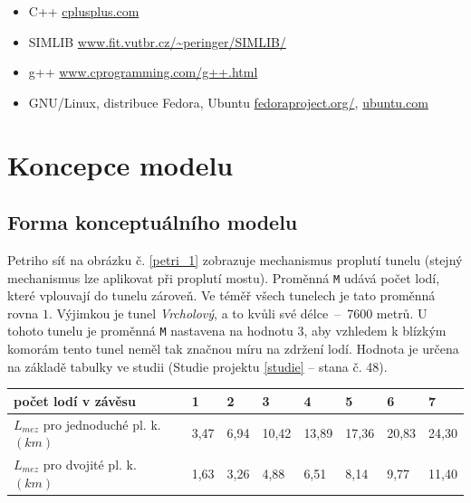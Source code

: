 \documentclass[11pt,a4paper]{article}
\begin{document}
      \begin{itemize}
        \item C++ \href{http://www.cplusplus.com/}{cplusplus.com}
        \item SIMLIB
          \href{http://www.fit.vutbr.cz/~peringer/SIMLIB/}
               {www.fit.vutbr.cz/\textasciitilde peringer/SIMLIB/}
        \item g++ \href{http://www.cprogramming.com/g++.html}
                       {www.cprogramming.com/g++.html}
        \item GNU/Linux, distribuce Fedora, Ubuntu
          \href{http://fedoraproject.org}{fedoraproject.org/},
          \href{http://ubuntu.com}{ubuntu.com}
      \end{itemize}

  \section{Koncepce modelu}

    \subsection{Forma konceptuálního modelu}


      Petriho síť na obrázku č. \ref{petri_1} zobrazuje mechanismus proplutí
      tunelu (stejný mechanismus lze aplikovat při proplutí mostu).
      Proměnná \texttt{M} udává počet lodí, které vplouvají do tunelu zároveň.
      Ve téměř všech tunelech je tato proměnná rovna $1$. Výjimkou je tunel
      \textit{Vrcholový}, a to kvůli své délce \,--\, 7600 metrů. U tohoto
      tunelu je proměnná \texttt{M} nastavena na hodnotu $3$, aby vzhledem k
      blízkým komorám tento tunel neměl tak značnou míru na zdržení lodí.
      Hodnota je určena na základě tabulky ve
      studii (Studie projektu \ref{studie} -- stana č. 48).

      \begin{center}
        \begin{tabular}{| l | l | l | l | l | l | l | l |}
          \hline
          počet lodí v závěsu & 1 & 2 & 3 & 4 & 5 & 6 & 7 \\ \hline
          $L_{mez}$ pro jednoduché pl. k. $(km)$
            & 3,47 & 6,94 & 10,42 & 13,89 & 17,36 & 20,83 & 24,30 \\ \hline
          $L_{mez}$ pro dvojité pl. k. $(km)$
            & 1,63 & 3,26 &  4,88 &  6,51 &  8,14 &  9,77 & 11,40 \\ \hline
          \end{tabular}
      \end{center}
\end{document}
